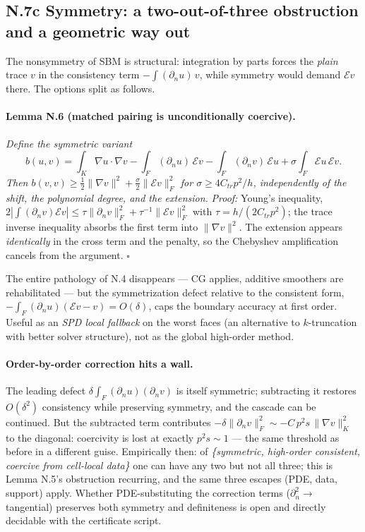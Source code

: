 \subsection*{N.7c Symmetry: a two-out-of-three obstruction and a geometric way out}

The nonsymmetry of SBM is structural: integration by parts forces the
\emph{plain} trace $v$ in the consistency term $-\int(\partial_n u)\,v$,
while symmetry would demand $\mathcal E v$ there. The options split as
follows.

\paragraph{Lemma N.6 (matched pairing is unconditionally coercive).}
\emph{Define the symmetric variant}
\[
  b(u,v) = \int_K \nabla u\cdot\nabla v
  - \int_F (\partial_n u)\,\mathcal E v
  - \int_F (\partial_n v)\,\mathcal E u
  + \sigma \int_F \mathcal E u\, \mathcal E v .
\]
\emph{Then $b(v,v) \ge \tfrac12\|\nabla v\|^2 + \tfrac{\sigma}{2}\|\mathcal
E v\|_F^2$ for $\sigma \ge 4 C_{tr} p^2/h$, independently of the shift, the
polynomial degree, and the extension.}
\emph{Proof:} Young's inequality,
$2|\int(\partial_n v)\mathcal E v| \le \tau \|\partial_n v\|_F^2 +
\tau^{-1}\|\mathcal E v\|_F^2$ with $\tau = h/(2C_{tr}p^2)$; the trace
inverse inequality absorbs the first term into $\|\nabla v\|^2$. The
extension appears \emph{identically} in the cross term and the penalty, so
the Chebyshev amplification cancels from the argument. $\square$

The entire pathology of N.4 disappears --- CG applies, additive smoothers
are rehabilitated --- but the symmetrization defect relative to the
consistent form,
$-\int_F (\partial_n u)(\mathcal E v - v) = O(\delta)$, caps the boundary
accuracy at first order. Useful as an \emph{SPD local fallback} on the
worst faces (an alternative to $k$-truncation with better solver
structure), not as the global high-order method.

\paragraph{Order-by-order correction hits a wall.} The leading defect
$\delta \int_F (\partial_n u)(\partial_n v)$ is itself symmetric;
subtracting it restores $O(\delta^2)$ consistency while preserving
symmetry, and the cascade can be continued. But the subtracted term
contributes $-\delta\|\partial_n v\|_F^2 \sim -C\,p^2 s\,\|\nabla v\|_K^2$
to the diagonal: coercivity is lost at exactly $p^2 s \sim 1$ --- the same
threshold as before in a different guise. Empirically then: of
\emph{\{symmetric, high-order consistent, coercive from cell-local
data\}} one can have any two but not all three; this is Lemma N.5's
obstruction recurring, and the same three escapes (PDE, data, support)
apply. Whether PDE-substituting the correction terms
($\partial_n^2 \to$ tangential) preserves both symmetry and definiteness
is open and directly decidable with the certificate script.

